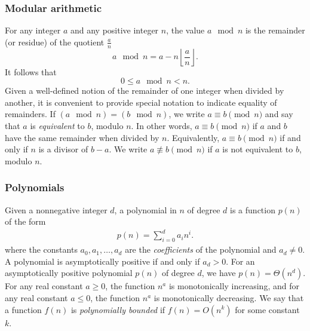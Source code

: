 \documentclass{report}
\begin{document}
        \subsubsection{Modular arithmetic}
        \bigbreak \noindent 
        For any integer $a$ and any positive integer $n$, the value $a \mod n$ is the remainder (or residue) of the quotient $\frac{a}{n}$
        \bigbreak \noindent 
        \[
            a \mod n = a - n \left\lfloor \frac{a}{n} \right\rfloor . \tag{3.8}
        \]
        It follows that
        \[
            0 \leq a \mod n < n . \tag{3.9}
        \]
        Given a well-defined notion of the remainder of one integer when divided by another, it is convenient to provide special notation to indicate equality of remainders. 
        If \( (a \mod n) = (b \mod n) \), we write \( a \equiv b \pmod{n} \) and say that \( a \) is \textit{equivalent} to \( b \), modulo \( n \). 
        In other words, \( a \equiv b \pmod{n} \) if \( a \) and \( b \) have the same remainder when divided by \( n \). 
        Equivalently, \( a \equiv b \pmod{n} \) if and only if \( n \) is a divisor of \( b - a \). 
        We write \( a \not\equiv b \pmod{n} \) if \( a \) is not equivalent to \( b \), modulo \( n \).

        \bigbreak \noindent 
        \subsubsection{Polynomials}
        \bigbreak \noindent 
        Given a nonnegative integer $d$, a polynomial in $n$ of degree $d$ is a function $p(n)$ of the form
        \begin{align*}
            p(n) = \sum_{i=0}^{d}a_{i}n^{i}
        .\end{align*}
        where the constants \( a_0, a_1, \dots, a_d \) are the \textit{coefficients} of the polynomial and \( a_d \neq 0 \). A polynomial is asymptotically positive if and only if \( a_d > 0 \). For an asymptotically positive polynomial \( p(n) \) of degree \( d \), we have \( p(n) = \Theta(n^d) \). For any real constant \( a \geq 0 \), the function \( n^a \) is monotonically increasing, and for any real constant \( a \leq 0 \), the function \( n^a \) is monotonically decreasing. We say that a function \( f(n) \) is \textit{polynomially bounded} if \( f(n) = O(n^k) \) for some constant \( k \).

        \bigbreak \noindent 
\end{document}
